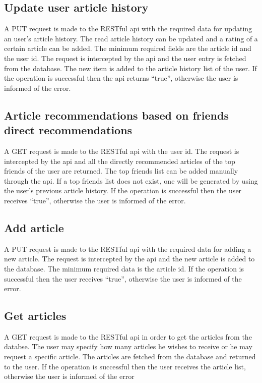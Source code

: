 \subsection{Update user article history}
\label{sec:workflow-update-user-article-history}
A PUT request is made to the RESTful api with the required data for updating an user's article history.
The read article history can be updated and a rating of a certain article can be added. 
The minimum required fields are the article id and the user id.
The request is intercepted by the api and the user entry is fetched from the database. The new item is added to the article history list of the user. If the operation is successful then the api returns “true”, otherwise the user is informed of the error. 

\subsection{Article recommendations based on friends direct recommendations}
\label{sec:workflow-friends-direct-recommendations}
A GET request is made to the RESTful api with the user id.
The request is intercepted by the api and all the directly recommended articles of the top friends of the user are returned.
The top friends list can be added manually through the api.
If a top friends list does not exist, one will be generated by using the user’s previous article history.
If the operation is successful then the user receives “true”, otherwise the user is informed of the error. 

\subsection{Add article}
\label{sec:workflow-add-article}
A PUT request is made to the RESTful api with the required data for adding a new article.
The request is intercepted by the api and the new article is added to the database.
The minimum required data is the article id.
If the operation is successful then the user receives “true”, otherwise the user is informed of the error.


\subsection{Get articles}
\label{sec:workflow-get-all-articles}
A GET request is made to the RESTful api in order to get the articles from the databse.
The user may specify how many articles he wishes to receive or he may request a specific article.
The articles are fetched from the database and returned to the user.
If the operation is successful then the user receives the article list, otherwise the user is informed of the error

